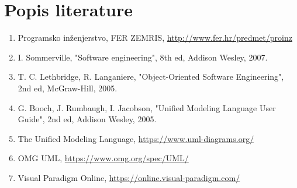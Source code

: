 \chapter*{Popis literature}
	 			
		
		\begin{enumerate}
			
			
			\item  Programsko inženjerstvo, FER ZEMRIS, \url{http://www.fer.hr/predmet/proinz}
			
			\item  I. Sommerville, "Software engineering", 8th ed, Addison Wesley, 2007.
			
			\item  T. C. Lethbridge, R. Langaniere, "Object-Oriented Software Engineering", 2nd ed, McGraw-Hill, 2005.
			
			\item  G. Booch, J. Rumbaugh, I. Jacobson, "Unified Modeling Language
User Guide", 2nd ed, Addison Wesley, 2005.		
			
			\item  The Unified Modeling Language, \url{https://www.uml-diagrams.org/}
			
			\item  OMG UML, \url{https://www.omg.org/spec/UML/}
						
			\item  Visual Paradigm Online, \url{https://online.visual-paradigm.com/}
		\end{enumerate}
		
		 